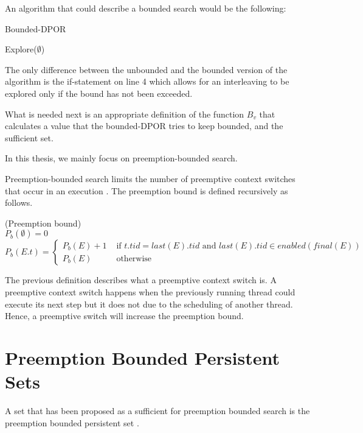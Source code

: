 An algorithm that could describe a bounded search would be the following:

\begin{algorithm}[H]
    \caption{Bounded-DPOR}
    Explore($\emptyset$)\;
\end{algorithm}

\noindent The only difference between the unbounded and the bounded version of the algorithm is the if-statement on line 4 which allows for an interleaving to be explored
only if the bound has not been exceeded.

What is needed next is an appropriate definition of the function $B_v$ that calculates a value that the bounded-DPOR tries to keep bounded, 
and the sufficient set. 

In this thesis, we mainly focus on preemption-bounded search. 

Preemption-bounded search limits the number of preemptive context switches that occur in an execution \cite{Musu07}. The 
preemption bound is defined recursively as follows.

\begin{definition}{(Preemption bound)}
\\
$P_b(\emptyset) = 0$ \\
$P_b(E.t) = 
 \begin{cases} 
    P_b(E) + 1 & \text{ if } t.tid = last(E).tid \text{ and } last(E).tid \in enabled(final(E)) \\
    P_b(E) & \text{ otherwise }
 \end{cases}
$\\
\end{definition}

The previous definition describes what a preemptive context switch is. A preemptive context switch happens when the previously running thread could execute
its next step but it does not due to the scheduling of another thread. Hence, a preemptive switch will increase the preemption bound.

\section{Preemption Bounded Persistent Sets}

A set that has been proposed as a sufficient for preemption bounded search is the preemption bounded persistent set \cite{BPOR}.

